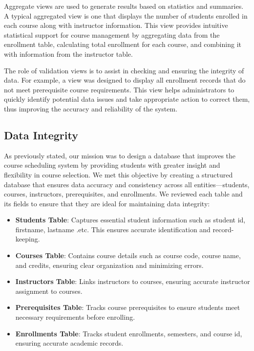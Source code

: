\documentclass[12pt]{article}
\begin{document}
Aggregate views are used to generate results based on statistics and summaries. A typical aggregated view is one that displays the number of students enrolled in each course along with instructor information. This view provides intuitive statistical support for course management by aggregating data from the enrollment table, calculating total enrollment for each course, and combining it with information from the instructor table.

The role of validation views is to assist in checking and ensuring the integrity of data. For example, a view was designed to display all enrollment records that do not meet prerequisite course requirements. This view helps administrators to quickly identify potential data issues and take appropriate action to correct them, thus improving the accuracy and reliability of the system.

\subsection{Data Integrity}

As previously stated, our mission was to design a database that improves the course scheduling system by providing students with greater insight and flexibility in course selection. We met this objective by creating a structured database that ensures data accuracy and consistency across all entities—students, courses, instructors, prerequisites, and enrollments. We reviewed each table and its fields to ensure that they are ideal for maintaining data integrity:

\begin{itemize}
  \item \textbf{Students Table}: Captures essential student information such as student id, firstname, lastname .etc. This ensures accurate identification and record-keeping.

  \item \textbf{Courses Table}: Contains course details such as course code, course name, and credits, ensuring clear organization and minimizing errors.

  \item \textbf{Instructors Table}: Links instructors to courses, ensuring accurate instructor assignment to courses.

  \item \textbf{Prerequisites Table}: Tracks course prerequisites to ensure students meet necessary requirements before enrolling.

  \item \textbf{Enrollments Table}: Tracks student enrollments, semesters, and course id, ensuring accurate academic records.
\end{itemize}
\end{document}

